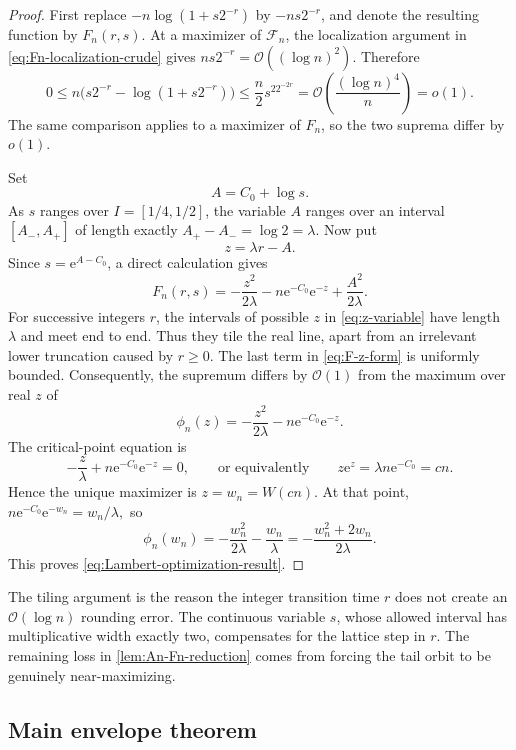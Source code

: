 \documentclass[11pt,oneside]{article}
\theoremstyle{definition}
\theoremstyle{remark}
\newcommand{\e}{\mathrm e}
\newcommand{\bigO}{\mathcal O}
\newcommand{\smallo}{o}
\begin{document}
\begin{proof}
First replace \(-n\log(1+s2^{-r})\) by \(-ns2^{-r}\), and denote the
resulting function by \(F_n(r,s)\).  At a maximizer of
\(\mathcal F_n\), the localization argument in
\eqref{eq:Fn-localization-crude} gives
\(ns2^{-r}=\bigO((\log n)^2)\).  Therefore
\[
 0\le n\bigl(s2^{-r}-\log(1+s2^{-r})\bigr)
 \le\frac n2s^22^{-2r}
 =\bigO\!\left(\frac{(\log n)^4}{n}\right)=\smallo(1).
\]
The same comparison applies to a maximizer of \(F_n\), so the two suprema
differ by \(\smallo(1)\).

Set
\[
 A=C_0+\log s.
\]
As \(s\) ranges over \(I=[1/4,1/2]\), the variable \(A\) ranges over an
interval \([A_-,A_+]\) of length exactly
\(
 A_+-A_-=\log2=\lambda.
\)
Now put
\begin{equation}
 z=\lambda r-A.
 \label{eq:z-variable}
\end{equation}
Since \(s=\e^{A-C_0}\), a direct calculation gives
\begin{equation}
 F_n(r,s)
 =-\frac{z^2}{2\lambda}
 -n\e^{-C_0}\e^{-z}
 +\frac{A^2}{2\lambda}.
 \label{eq:F-z-form}
\end{equation}
For successive integers \(r\), the intervals of possible \(z\) in
\eqref{eq:z-variable} have length \(\lambda\) and meet end to end.  Thus they
tile the real line, apart from an irrelevant lower truncation caused by
\(r\ge0\).  The last term in \eqref{eq:F-z-form} is uniformly bounded.
Consequently, the supremum differs by \(\bigO(1)\) from the maximum over real
\(z\) of
\[
 \phi_n(z)=-\frac{z^2}{2\lambda}-n\e^{-C_0}\e^{-z}.
\]
The critical-point equation is
\[
 -\frac z\lambda+n\e^{-C_0}\e^{-z}=0,
 \qquad\text{or equivalently}\qquad
 z\e^z=\lambda n\e^{-C_0}=cn.
\]
Hence the unique maximizer is \(z=w_n=W(cn)\).  At that point,
\(
 n\e^{-C_0}\e^{-w_n}=w_n/\lambda,
\)
so
\[
 \phi_n(w_n)
 =-\frac{w_n^2}{2\lambda}-\frac{w_n}{\lambda}
 =-\frac{w_n^2+2w_n}{2\lambda}.
\]
This proves \eqref{eq:Lambert-optimization-result}.
\end{proof}

The tiling argument is the reason the integer transition time \(r\) does not
create an \(\bigO(\log n)\) rounding error.  The continuous variable \(s\),
whose allowed interval has multiplicative width exactly two, compensates for
the lattice step in \(r\).  The remaining loss in
\cref{lem:An-Fn-reduction} comes from forcing the tail orbit to be genuinely
near-maximizing.

\subsection{Main envelope theorem}
\end{document}

